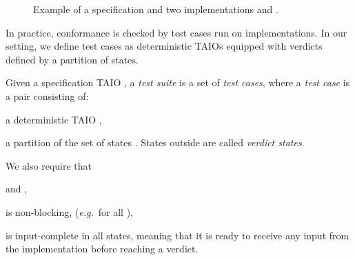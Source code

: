 \documentclass{LMCS}
\theoremstyle{plain}\newtheorem{proposition}[thm]{Proposition}
\def\eg{{\em e.g.}}
\begin{document}
\begin{center}
\begin{figure}[hbt]
{\begin{minipage}{0.45\textwidth}
\begin{center}
 \end{center}
 \end{minipage}}

 \caption{Example of a specification  and two implementations  and .}\label{imps}\end{figure}   
 \end{center}
In practice, conformance is checked by test cases run on implementations.
In our setting, we define test cases as deterministic TAIOs
equipped with verdicts defined by a partition of states.

\begin{defi}
Given a specification TAIO , 
a {\em test suite} is a set of {\em test cases},
where 
a {\em test case} is a pair 
consisting of:
\begin{iteMize}{}
\item a deterministic TAIO 
,
\item a partition  of the set of states 
.
States outside  are called {\em verdict states}. 
\end{iteMize} 
We also require that
\begin{iteMize}{}
\item 
 and ,
\item 
 is non-blocking, (\eg\  for all ),\item 
  is input-complete in all  states, 
meaning that it is ready to receive any input from the implementation
before reaching a verdict.
\end{iteMize}
\end{defi}\medskip
\end{document}

